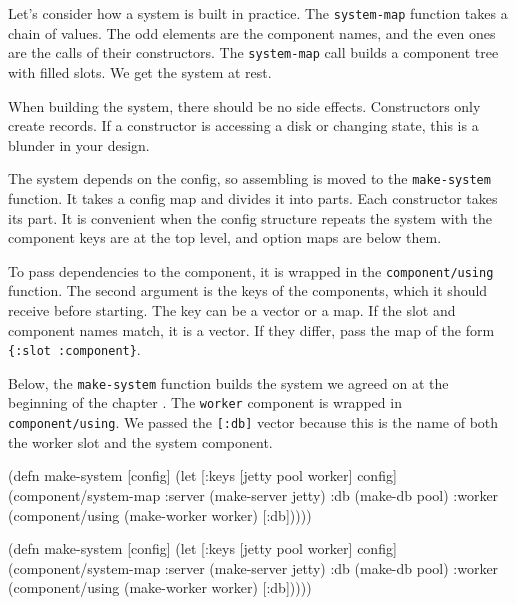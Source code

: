 Let's consider how a system is built in practice. The \verb|system-map| function takes a chain of values. The odd elements are the component names, and the even ones are the calls of their constructors. The \verb|system-map| call builds a component tree with filled slots. We get the system at rest.


When building the system, there should be no side effects. Constructors only create records. If a constructor is accessing a disk or changing state, this is a blunder in your design.

The system depends on the config, so assembling is moved to the \verb|make-system| function. It takes a config map and divides it into parts. Each constructor takes its part. It is convenient when the config structure repeats the system with the component keys are at the top level, and option maps are below them.

To pass dependencies to the component, it is wrapped in the \verb|component/using| function. The second argument is the keys of the components, which it should receive before starting. The key can be a vector or a map. If the slot and component names match, it is a vector. If they differ, pass the map of the form \verb|{:slot :component}|.

Below, the \verb|make-system| function builds the system we agreed on at the beginning of the chapter . The \verb|worker| component is wrapped in \verb|component/using|. We passed the \verb|[:db]| vector because this is the name of both the worker slot and the system component.

\ifnarrow

\begin{english}
  \begin{clojure}
(defn make-system
  [config]
  (let [{:keys [jetty pool worker]}
        config]
    (component/system-map
     :server (make-server jetty)
     :db     (make-db pool)
     :worker (component/using
               (make-worker worker)
               [:db]))))
  \end{clojure}
\end{english}

\else

\begin{english}
  \begin{clojure}
(defn make-system
  [config]
  (let [{:keys [jetty pool worker]} config]
    (component/system-map
     :server (make-server jetty)
     :db     (make-db pool)
     :worker (component/using
              (make-worker worker) [:db]))))
  \end{clojure}
\end{english}


